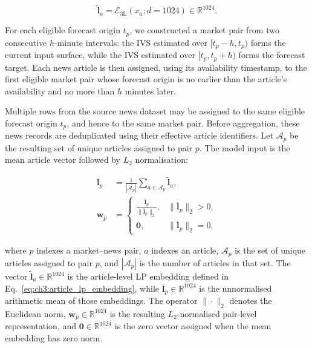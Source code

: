 \begin{equation}\label{eq:ch3:article_lp_embedding}
\widetilde{\mathbf l}_a
=
\mathcal{E}_{\mathrm{3L}}(x_a;d=1024)
\in\mathbb{R}^{1024}.
\end{equation}


For each eligible forecast origin \(t_p\), we constructed a market pair from
two consecutive \(h\)-minute intervals: the IVS estimated over
\([t_p-h,t_p)\) forms the current input surface, while the IVS estimated over
\([t_p,t_p+h)\) forms the forecast target. Each news article is then assigned,
using its availability timestamp, to the first eligible market pair whose
forecast origin is no earlier than the article's availability and no more than
\(h\) minutes later.


Multiple rows from the source news dataset may be assigned to the same eligible
forecast origin \(t_p\), and hence to the same market pair. Before aggregation,
these news records are deduplicated using their effective article identifiers.
Let \(\mathcal A_p\) be the resulting set of unique articles assigned to pair
\(p\). The model input is the mean article vector followed by \(L_2\) normalisation:



\begin{equation}\label{eq:ch3:pair_lp_embedding}
\begin{aligned}
\overline{\mathbf l}_p
&=
\frac{1}{|\mathcal A_p|}
\sum_{a\in\mathcal A_p}\widetilde{\mathbf l}_a,\\
\mathbf w_p
&=
\begin{cases}
\displaystyle
\frac{\overline{\mathbf l}_p}{\|\overline{\mathbf l}_p\|_2},
& \|\overline{\mathbf l}_p\|_2>0,\\[6pt]
\mathbf 0,
& \|\overline{\mathbf l}_p\|_2=0.
\end{cases}
\end{aligned}
\end{equation}


where \(p\) indexes a market--news pair, \(a\) indexes an article, \(\mathcal A_p\) is the set of unique articles assigned to pair \(p\), and \(|\mathcal A_p|\) is the number of articles in that set. The vector \(\widetilde{\mathbf l}_a\in\mathbb{R}^{1024}\) is the article-level LP embedding defined in Eq.~\eqref{eq:ch3:article_lp_embedding}, while \(\overline{\mathbf l}_p\in\mathbb{R}^{1024}\) is the unnormalised arithmetic mean of those embeddings. The operator \(\|\cdot\|_2\) denotes the Euclidean norm, \(\mathbf w_p\in\mathbb{R}^{1024}\) is the resulting \(L_2\)-normalised pair-level representation, and \(\mathbf 0\in\mathbb{R}^{1024}\) is the zero vector assigned when the mean embedding has zero norm.


